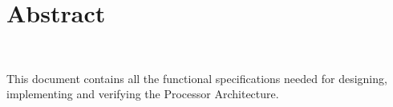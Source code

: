 \newpage
\section*{Abstract}
\label{sec:abstract}

\


This document contains all the functional specifications needed for designing, implementing
and verifying the \xfire Processor Architecture.